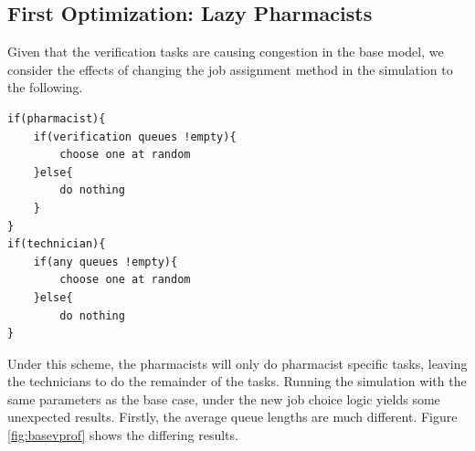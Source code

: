 \documentclass[10pt]{report}            %
\begin{document}
\subsection*{First Optimization: Lazy Pharmacists}
Given that the verification tasks are causing congestion in the base model, we consider the effects of changing the job assignment method in the simulation to the following.
\begin{verbatim}
if(pharmacist){
    if(verification queues !empty){
        choose one at random
    }else{
        do nothing
    }
}
if(technician){
    if(any queues !empty){
        choose one at random
    }else{
        do nothing
}
\end{verbatim}
Under this scheme, the pharmacists will only do pharmacist specific tasks, leaving the technicians to do the remainder of the tasks. Running the simulation with the same parameters as the base case, under the new job choice logic yields some unexpected results. Firstly, the average queue lengths are much different. Figure \ref{fig:basevprof} shows the differing results.
\end{document}

